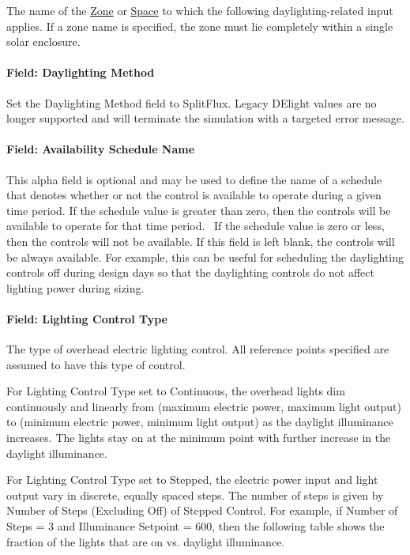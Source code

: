 The name of the \hyperref[zone]{Zone} or \hyperref[space]{Space} to which the following daylighting-related input applies. If a zone name is specified, the zone must lie completely within a single solar enclosure.

\paragraph{Field: Daylighting Method}\label{field-daylighting-method}

Set the Daylighting Method field to SplitFlux. Legacy DElight values are no longer supported and will terminate the simulation with a targeted error message.

\paragraph{Field: Availability Schedule Name}\label{field-availability-schedule-name-002}

This alpha field is optional and may be used to define the name of a schedule that denotes whether or not the control is available to operate during a given time period. If the schedule value is greater than zero, then the controls will be available to operate for that time period.~ If the schedule value is zero or less, then the controls will not be available. If this field is left blank, the controls will be always available. For example, this can be useful for scheduling the daylighting controls off during design days so that the daylighting controls do not affect lighting power during sizing.

\paragraph{Field: Lighting Control Type}\label{field-lighting-control-type}

The type of overhead electric lighting control. All reference points specified are assumed to have this type of control.

For Lighting Control Type set to Continuous, the overhead lights dim continuously and linearly from (maximum electric power, maximum light output) to (minimum electric power, minimum light output) as the daylight illuminance increases. The lights stay on at the minimum point with further increase in the daylight illuminance.

For Lighting Control Type set to Stepped, the electric power input and light output vary in discrete, equally spaced steps. The number of steps is given by Number of Steps (Excluding Off) of Stepped Control. For example, if Number of Steps = 3 and Illuminance Setpoint = 600, then the following table shows the fraction of the lights that are on vs. daylight illuminance.

